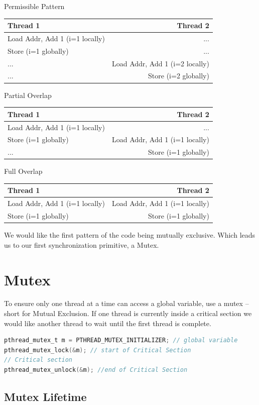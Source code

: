 Permissible Pattern

\begin{tabular}{ l | r }
  Thread 1 & Thread 2 \\ \hline
  Load Addr, Add 1 (i=1 locally) & ...  \\
  Store (i=1 globally) & ...  \\
  ... & Load Addr, Add 1 (i=2 locally)  \\
  ... & Store (i=2 globally)  \\
\end{tabular}

Partial Overlap
\begin{tabular}{ l | r }
Thread 1 & Thread 2 \\ \hline
Load Addr, Add 1 (i=1 locally) & ... \\
Store (i=1 globally) & Load Addr, Add 1 (i=1 locally) \\
... & Store (i=1 globally) \\
\end{tabular}

Full Overlap
\begin{tabular}{ l | r }
Thread 1 & Thread 2 \\ \hline
Load Addr, Add 1 (i=1 locally) & Load Addr, Add 1 (i=1 locally) \\
Store (i=1 globally) & Store (i=1 globally) \\
\end{tabular}

We would like the first pattern of the code being mutually exclusive.
Which leads us to our first synchronization primitive, a Mutex.

\section{Mutex}

To ensure only one thread at a time can access a global variable, use a mutex -- short for Mutual Exclusion.
If one thread is currently inside a critical section we would like another thread to wait until the first thread is complete.

\begin{lstlisting}[language=C]
pthread_mutex_t m = PTHREAD_MUTEX_INITIALIZER; // global variable
pthread_mutex_lock(&m); // start of Critical Section
// Critical section
pthread_mutex_unlock(&m); //end of Critical Section
\end{lstlisting}

\subsection{Mutex Lifetime}

